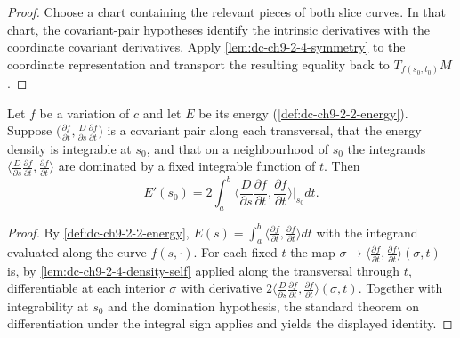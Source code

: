 \begin{proof}
  \leanok
  \sketch
  Choose a chart containing the relevant pieces of both slice curves. In that chart,
  the covariant-pair hypotheses identify the intrinsic derivatives with the coordinate
  covariant derivatives. Apply \cref{lem:dc-ch9-2-4-symmetry} to the coordinate
  representation and transport the resulting equality back to $T_{f(s_0,t_0)}M$.

\end{proof}
\begin{lemma}
  \label{lem:dc-ch9-2-4-under-integral}
  \leanok
  Let $f$ be a variation of $c$ and let $E$ be its energy (\cref{def:dc-ch9-2-2-energy}).
  Suppose $\big(\frac{\partial f}{\partial t},\frac{D}{\partial s}\frac{\partial f}{\partial t}\big)$
  is a covariant pair along each transversal, that the energy density is integrable at
  $s_0$, and that on a neighbourhood of $s_0$ the integrands
  $\big\langle\frac{D}{\partial s}\frac{\partial f}{\partial t},\frac{\partial f}{\partial t}\big\rangle$
  are dominated by a fixed integrable function of $t$. Then
  $$
  E'(s_0)
    = 2\int_a^b\Big\langle\frac{D}{\partial s}\frac{\partial f}{\partial t},\frac{\partial f}{\partial t}\Big\rangle\Big|_{s_0} dt .
  $$

\end{lemma}
\begin{proof}
  \leanok
  \sketch
  By \cref{def:dc-ch9-2-2-energy}, $E(s)=\int_a^b\langle\frac{\partial f}{\partial t},\frac{\partial f}{\partial t}\rangle dt$
  with the integrand evaluated along the curve $f(s,\cdot)$. For each fixed $t$ the map
  $\sigma\mapsto\langle\frac{\partial f}{\partial t},\frac{\partial f}{\partial t}\rangle(\sigma,t)$
  is, by \cref{lem:dc-ch9-2-4-density-self} applied along the transversal through $t$,
  differentiable at each interior $\sigma$ with derivative
  $2\langle\frac{D}{\partial s}\frac{\partial f}{\partial t},\frac{\partial f}{\partial t}\rangle(\sigma,t)$.
  Together with integrability at $s_0$ and the domination hypothesis, the standard theorem
  on differentiation under the integral sign applies and yields the displayed identity.

\end{proof}
